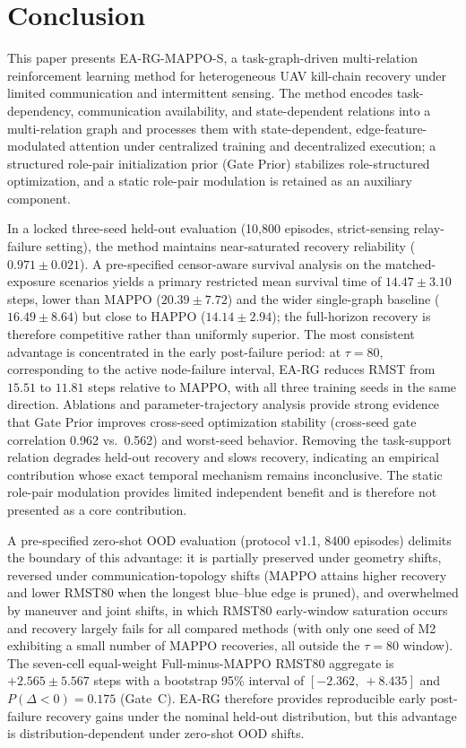 \section{Conclusion}

This paper presents EA-RG-MAPPO-S, a task-graph-driven multi-relation reinforcement learning method for heterogeneous UAV kill-chain recovery under limited communication and intermittent sensing. The method encodes task-dependency, communication availability, and state-dependent relations into a multi-relation graph and processes them with state-dependent, edge-feature-modulated attention under centralized training and decentralized execution; a structured role-pair initialization prior (Gate Prior) stabilizes role-structured optimization, and a static role-pair modulation is retained as an auxiliary component.

In a locked three-seed held-out evaluation (10{,}800 episodes, strict-sensing relay-failure setting), the method maintains near-saturated recovery reliability ($0.971 \pm 0.021$). A pre-specified censor-aware survival analysis on the matched-exposure scenarios yields a primary restricted mean survival time of $14.47 \pm 3.10$ steps, lower than MAPPO ($20.39 \pm 7.72$) and the wider single-graph baseline ($16.49 \pm 8.64$) but close to HAPPO ($14.14 \pm 2.94$); the full-horizon recovery is therefore competitive rather than uniformly superior. The most consistent advantage is concentrated in the early post-failure period: at $\tau = 80$, corresponding to the active node-failure interval, EA-RG reduces RMST from $15.51$ to $11.81$ steps relative to MAPPO, with all three training seeds in the same direction. Ablations and parameter-trajectory analysis provide strong evidence that Gate Prior improves cross-seed optimization stability (cross-seed gate correlation 0.962 vs.\ 0.562) and worst-seed behavior. Removing the task-support relation degrades held-out recovery and slows recovery, indicating an empirical contribution whose exact temporal mechanism remains inconclusive. The static role-pair modulation provides limited independent benefit and is therefore not presented as a core contribution.

A pre-specified zero-shot OOD evaluation (protocol v1.1, 8400 episodes) delimits the boundary of this advantage: it is partially preserved under geometry shifts, reversed under communication-topology shifts (MAPPO attains higher recovery and lower RMST80 when the longest blue--blue edge is pruned), and overwhelmed by maneuver and joint shifts, in which RMST80 early-window saturation occurs and recovery largely fails for all compared methods (with only one seed of M2 exhibiting a small number of MAPPO recoveries, all outside the $\tau=80$ window). The seven-cell equal-weight Full-minus-MAPPO RMST80 aggregate is $+2.565 \pm 5.567$ steps with a bootstrap 95\% interval of $[-2.362,\ +8.435]$ and $P(\Delta<0)=0.175$ (Gate~C). EA-RG therefore provides reproducible early post-failure recovery gains under the nominal held-out distribution, but this advantage is distribution-dependent under zero-shot OOD shifts.

